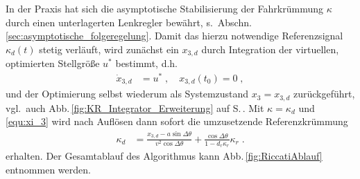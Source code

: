In der Praxis hat sich die asymptotische Stabilisierung der Fahrkrümmung $\kappa$ durch einen unterlagerten Lenk\-reg\-ler bewährt, s.\ Abschn.\,\ref{sec:asymptotische_folgeregelung}.  Damit das hierzu notwendige Referenzsignal $\kappa_d(t)$ stetig verläuft, wird zunächst ein $x_{3,d}$ durch Integration der virtuellen, optimierten Stellgröße $u^\ast$ bestimmt, d.h.\
%
\begin{align}
\nonumber
	\dot x_{3,d} &= u^\ast \; , \quad x_{3,d}(t_0) =  0 \; ,
\end{align}
und der Optimierung selbst wiederum als Systemzustand $x_3 = x_{3,d}$ zurückgeführt, vgl.\ auch Abb.\,\ref{fig:KR_Integrator_Erweiterung} auf S.\,\pageref{fig:KR_Integrator_Erweiterung}. %
%
%
Mit $\kappa = \kappa_d$ und \eqref{equ:xi_3} wird nach Auflösen dann sofort die umzusetzende Referenzkrümmung
\begin{align}	\kappa_d &= \frac{x_{3,d} - a \sin  \Delta\theta}{v^2 \cos  \Delta\theta} + \frac{\cos \Delta\theta}{1-d_r \kappa_r}\kappa_r \; . \label{equ:kappa_d}
\end{align}
erhalten. 
Der Gesamtablauf des Algorithmus kann Abb.\,\ref{fig:RiccatiAblauf} entnommen werden.

 



